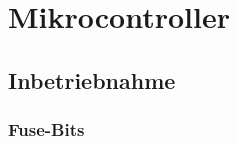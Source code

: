 \section{Mikrocontroller}\label{Appendix:Mikrocontroller}


\subsection{Inbetriebnahme}\label{Appendix:Inbetriebnahme_uC}

\subsubsection{Fuse-Bits}


%
%
%

